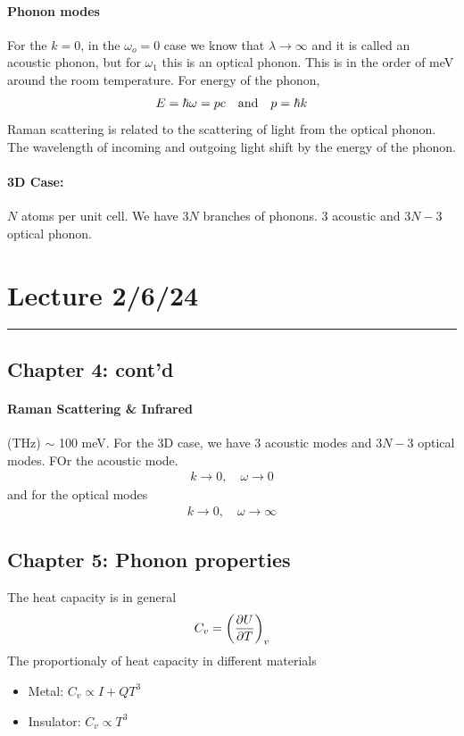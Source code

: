 \documentclass[../main.tex]{subfiles}
\begin{document}
\paragraph{Phonon modes} For the $k=0$, in the $\omega_o = 0$ case we know that
$\lambda \to \infty$ and it is called an acoustic phonon, but for $\omega_1$ this is an optical 
phonon. This is in the order of meV around the room temperature. For energy of the phonon,
\begin{align*}
    E = \hbar \omega = pc \qand p = \hbar k
\end{align*}
Raman scattering is related to the scattering of light from the optical phonon. The wavelength of
incoming and outgoing light shift by the energy of the phonon.

\paragraph{3D Case:} $N$ atoms per unit cell. We have $3N$ branches of phonons. 3 acoustic and
$3N - 3$ optical phonon.

\newpage
\section{Lecture 2/6/24}
\hrule \vspace{10px}

\subsection*{Chapter 4: cont'd}

\paragraph*{Raman Scattering \& Infrared} (THz) $\sim$ 100 meV.
For the 3D case, we have 3 acoustic modes and $3N - 3$ optical modes. FOr the acoustic mode.
\begin{align*}
    k \to 0, \quad \omega \to 0
\end{align*}
and for the optical modes
\begin{align*}
    k \to 0, \quad \omega \to \infty
\end{align*}

\subsection*{Chapter 5: Phonon properties} 

The heat capacity is in general
\begin{align*}
    C_v = \qt(\pdv{U}{T})_v
\end{align*}
The proportionaly of heat capacity in different materials
\begin{itemize}
    \item Metal: $C_v \propto I + Q T^3$
    \item Insulator: $C_v \propto T^3$
\end{itemize}
\end{document}
